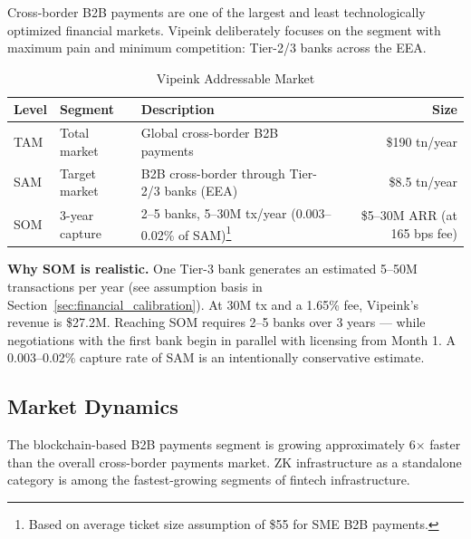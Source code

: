 \documentclass[11pt,a4paper]{article}
\begin{document}
Cross-border B2B payments are one of the largest and least technologically optimized financial markets. Vipeink deliberately focuses on the segment with maximum pain and minimum competition: Tier-2/3 banks across the EEA.

\begin{table}[htbp]
\centering
\caption{Vipeink Addressable Market}
\begin{tabularx}{\linewidth}{@{}llXr@{}}
\toprule
\textbf{Level} & \textbf{Segment} & \textbf{Description} & \textbf{Size} \\
\midrule
TAM & Total market    & Global cross-border B2B payments~\cite{bis_crossborder,mckinsey_payments}                         & \$190 tn/year \\
SAM & Target market  & B2B cross-border through Tier-2/3 banks (EEA)~\cite{ecb_payments,bis_crossborder}             & \$8.5 tn/year \\
SOM & 3-year capture & 2--5 banks, 5--30M tx/year (0.003--0.02\% of SAM)\footnote{Based on average ticket size assumption of \$55 for SME B2B payments.}          & \$5--30M ARR (at 165 bps fee)  \\
\bottomrule
\end{tabularx}
\end{table}

\noindent\textbf{Why SOM is realistic.} One Tier-3 bank generates an estimated 5--50M transactions per year (see assumption basis in Section~\ref{sec:financial_calibration}). At 30M tx and a 1.65\% fee, Vipeink's revenue is \$27.2M. Reaching SOM requires 2--5 banks over 3 years --- while negotiations with the first bank begin in parallel with licensing from Month 1. A 0.003--0.02\% capture rate of SAM is an intentionally conservative estimate.

\subsection*{Market Dynamics}

The blockchain-based B2B payments segment is growing approximately 6$\times$ faster than the overall cross-border payments market. ZK infrastructure as a standalone category is among the fastest-growing segments of fintech infrastructure.
\end{document}
